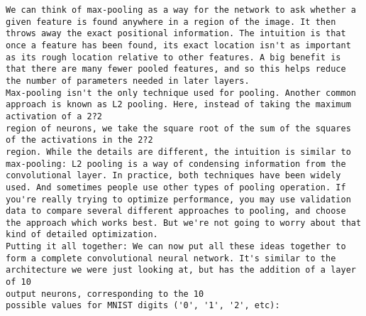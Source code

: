 \begin{lstlisting}
We can think of max-pooling as a way for the network to ask whether a given feature is found anywhere in a region of the image. It then throws away the exact positional information. The intuition is that once a feature has been found, its exact location isn't as important as its rough location relative to other features. A big benefit is that there are many fewer pooled features, and so this helps reduce the number of parameters needed in later layers.
Max-pooling isn't the only technique used for pooling. Another common approach is known as L2 pooling. Here, instead of taking the maximum activation of a 2?2
region of neurons, we take the square root of the sum of the squares of the activations in the 2?2
region. While the details are different, the intuition is similar to max-pooling: L2 pooling is a way of condensing information from the convolutional layer. In practice, both techniques have been widely used. And sometimes people use other types of pooling operation. If you're really trying to optimize performance, you may use validation data to compare several different approaches to pooling, and choose the approach which works best. But we're not going to worry about that kind of detailed optimization.
Putting it all together: We can now put all these ideas together to form a complete convolutional neural network. It's similar to the architecture we were just looking at, but has the addition of a layer of 10
output neurons, corresponding to the 10
possible values for MNIST digits ('0', '1', '2', etc):


\end{lstlisting}
